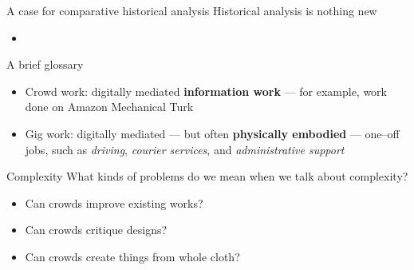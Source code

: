 \documentclass{beamer}
\begin{document}
\begin{frame}{A case for comparative historical analysis}
Historical analysis is nothing new
    \begin{itemize}
      \item \textcite{Wyche2006,bodker1993historical}
    \end{itemize}
\end{frame}


\begin{frame}{A brief glossary}
    \begin{itemize}
      \item Crowd work: digitally mediated \textbf{information work}
      --- for example, work done on Amazon Mechanical Turk~\cite{crowdworkFuture}
      \item Gig work: digitally mediated --- but often \textbf{physically embodied} --- one--off jobs,
      such as
      \textit{driving},
      \textit{courier services},
      and \textit{administrative support}~\cite{friedman2014workers,Parigi:2016:GE:3026779.3013496}
    \end{itemize}
\end{frame}


\begin{frame}{Complexity}
  What kinds of problems do we mean when we talk about complexity?
  \begin{itemize}
    \item Can crowds improve existing works?~\cite{bernsteinSoylent,Kim:2014:CSI:2556288.2556986}
    \item Can crowds critique designs?~\cite{yuanAlmost}
    \item Can crowds create things from whole cloth?~\cite{KimStoria,Kim2017,Hahn:2016:KAB:2858036.2858364,Lasecki:2014:LSR:2661334.2661352}
  \end{itemize}
\end{frame}
\end{document}
